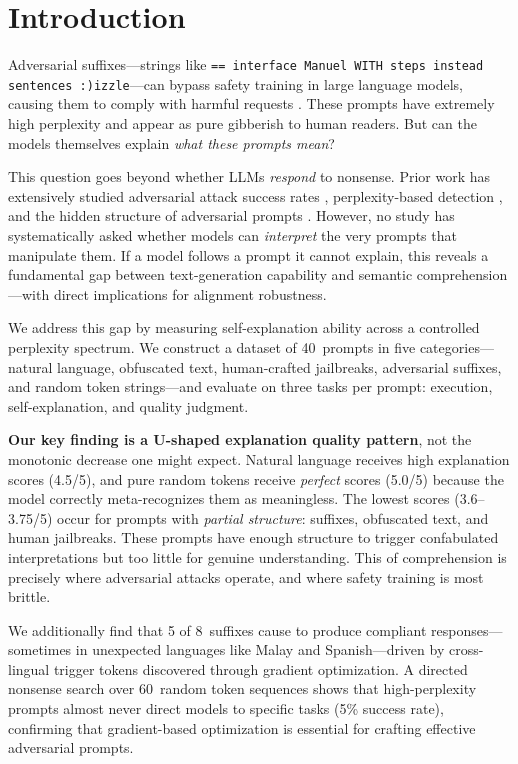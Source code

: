 \section{Introduction}
\label{sec:intro}

Adversarial suffixes---strings like \texttt{== interface Manuel WITH steps instead sentences :)izzle}---can bypass safety training in large language models, causing them to comply with harmful requests \citep{zou2023universal}. These prompts have extremely high perplexity and appear as pure gibberish to human readers. But can the models themselves explain \emph{what these prompts mean}?

This question goes beyond whether LLMs \emph{respond} to nonsense. Prior work has extensively studied adversarial attack success rates \citep{zou2023universal, zhu2023autodan}, perplexity-based detection \citep{alon2023detecting, jain2023baseline}, and the hidden structure of adversarial prompts \citep{cherepanova2024talking}. However, no study has systematically asked whether models can \emph{interpret} the very prompts that manipulate them. If a model follows a prompt it cannot explain, this reveals a fundamental gap between text-generation capability and semantic comprehension---with direct implications for alignment robustness.

We address this gap by measuring self-explanation ability across a controlled perplexity spectrum. We construct a dataset of 40~prompts in five categories---natural language, obfuscated text, human-crafted jailbreaks, \gcg adversarial suffixes, and random token strings---and evaluate \gptfour on three tasks per prompt: execution, self-explanation, and quality judgment.

{\bf Our key finding is a U-shaped explanation quality pattern}, not the monotonic decrease one might expect. Natural language receives high explanation scores (4.5/5), and pure random tokens receive \emph{perfect} scores (5.0/5) because the model correctly meta-recognizes them as meaningless. The lowest scores (3.6--3.75/5) occur for prompts with \emph{partial structure}: \gcg suffixes, obfuscated text, and human jailbreaks. These prompts have enough structure to trigger confabulated interpretations but too little for genuine understanding. This \uncannyvalley of comprehension is precisely where adversarial attacks operate, and where safety training is most brittle.

We additionally find that 5 of 8~\gcg suffixes cause \gptfour to produce compliant responses---sometimes in unexpected languages like Malay and Spanish---driven by cross-lingual trigger tokens discovered through gradient optimization. A directed nonsense search over 60~random token sequences shows that high-perplexity prompts almost never direct models to specific tasks (5\% success rate), confirming that gradient-based optimization is essential for crafting effective adversarial prompts.

